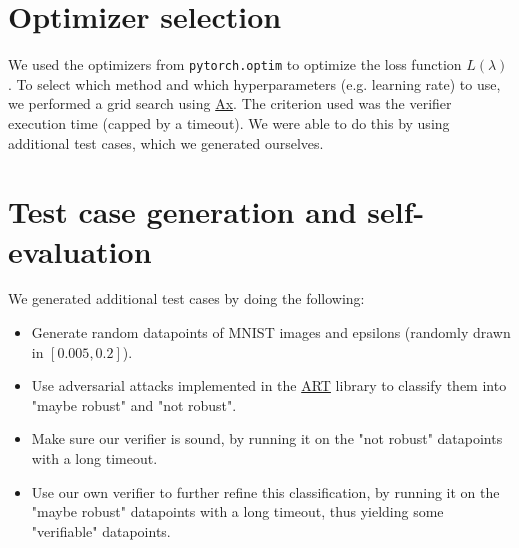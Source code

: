 \documentclass{article}
\begin{document}
\section{Optimizer selection}

We used the optimizers from \texttt{pytorch.optim} to optimize the loss function $L(\lambda)$. 
To select which method and which hyperparameters (e.g. learning rate) to use, we performed a grid search using \href{https://github.com/facebook/Ax}{Ax}.
The criterion used was the verifier execution time (capped by a timeout).
We were able to do this by using additional test cases, which we generated ourselves.

\section{Test case generation and self-evaluation}

We generated additional test cases by doing the following:
\begin{itemize}[noitemsep]
    \item Generate random datapoints of MNIST images and epsilons (randomly drawn in $[0.005, 0.2]$).
    \item Use adversarial attacks implemented in the \href{https://github.com/IBM/adversarial-robustness-toolbox/}{ART} library to classify them into "maybe robust" and "not robust".
    \item Make sure our verifier is sound, by running it on the "not robust" datapoints with a long timeout.
    \item Use our own verifier to further refine this classification, by running it on the "maybe robust" datapoints with a long timeout, thus yielding some "verifiable" datapoints.
\end{itemize}
\end{document}

